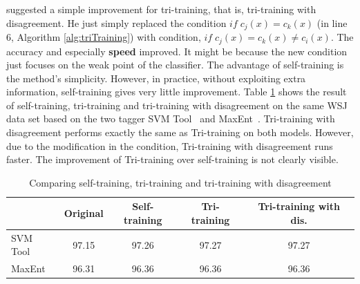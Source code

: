  suggested a simple improvement for tri-training, that is, tri-training with disagreement. He just simply replaced the condition {$ if \;c_j(x) = c_k(x)$} (in line 6, Algorithm \ref{alg:triTraining}) with condition, $ if \;c_j(x) = c_k(x)\neq c_i(x)$. The accuracy and especially \textbf{speed} improved. It might be because the new condition just focuses on the weak point of the classifier. The advantage of self-training is the method's simplicity. However, in practice, without exploiting extra information, self-training gives very little improvement. Table \ref{tab:triTraining} shows the result of self-training, tri-training and tri-training with disagreement on the same WSJ data set based on the two tagger SVM Tool~\cite{svmtool} and MaxEnt~\cite{Toutanova:2003}. Tri-training with disagreement performs exactly the same as Tri-training on both models. However, due to the modification in the condition, Tri-training with disagreement runs faster. The improvement of Tri-training over self-training is not clearly visible. 
\begin{table}
\;
  \centering
    \begin{tabular}{p{2cm}|cccc}
    & Original & Self-training & Tri-training & Tri-training with dis.\\
    \hline
	SVM Tool & 97.15 & 97.26 & 97.27 & 97.27 \\
    \hline
	MaxEnt & 96.31 & 96.36 & 96.36 & 96.36 \\
    \hline
    \end{tabular}
  \caption{Comparing self-training, tri-training and tri-training with
   disagreement}  
  \label{tab:triTraining}
\end{table}
